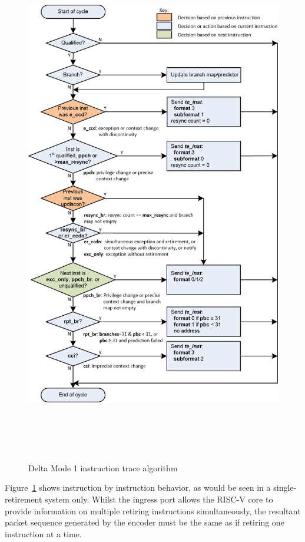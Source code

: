 \begin{figure}
\begin{center}
  \includegraphics[height=23cm, width=15cm]{algo.png}
  \caption{Delta Mode 1 instruction trace algorithm}
  \label{fig:algo}
\end{center}
\end{figure}

Figure~\ref{fig:algo} shows instruction by instruction behavior, as would be
seen in a single-retirement system only.  Whilst the ingress port allows the RISC-V core to
provide information on multiple retiring instructions simultaneously, the resultant packet
sequence generated by the encoder must be the same as if retiring one instruction at a time.

